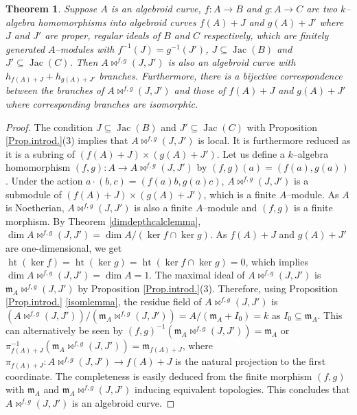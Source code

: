 \documentclass{amsart}%
\newtheorem{theorem}{Theorem}[section]
\theoremstyle{plain}
\numberwithin{equation}{section}
\theoremstyle{definition}
\DeclareMathOperator{\jac}{Jac}
\DeclareMathOperator{\height}{ht}
\begin{document}
    
\begin{theorem}\label{algebroidthm}
    Suppose $A$ is an algebroid curve, $f:A\to B$ and $g:A\to C$ are two $k$--algebra homomorphisms into algebroid curves $f(A)+J$ and $g(A)+J'$ where $J$ and $J'$ are proper, regular ideals of $B$ and $C$ respectively, which are finitely generated $A$--modules with $f^{-1}(J)=g^{-1}(J')$, $J\subseteq \jac(B)$ and $J'\subseteq \jac(C)$. Then $A\bowtie^{f,g}(J,J')$ is also an algebroid curve with $h_{f(A)+J}+h_{g(A)+J'}$ branches. Furthermore, there is a bijective correspondence between the branches of $A\bowtie^{f,g}(J,J')$ and those of $f(A)+J$ and $g(A)+J'$ where corresponding branches are isomorphic.
\end{theorem}
\begin{proof}
    The condition $J\subseteq \jac(B)$ and $J'\subseteq \jac(C)$ with Proposition \ref{Prop.introd.}(3) implies that $A\bowtie^{f,g}(J,J')$ is local. It is furthermore reduced as it is a subring of $(f(A)+J)\times (g(A)+J')$. Let us define a $k$--algebra homomorphism $(f,g):A\to A\bowtie^{f,g}(J,J')$ by $(f,g)(a)=(f(a),g(a))$. Under the action $a\cdot(b,c)=(f(a)b,g(a)c)$, $A\bowtie^{f,g}(J,J')$ is a submodule of $(f(A)+J)\times (g(A)+J')$, which is a finite $A$--module. As $A$ is Noetherian, $A\bowtie^{f,g}(J,J')$ is also a finite $A$--module and $(f,g)$ is a finite morphism. By Theorem \ref{dimdepthcalclemma}, $\dim A\bowtie^{f,g}(J,J')=\dim A/(\ker f\cap \ker g)$. As $f(A)+J$ and $g(A)+J'$ are one-dimensional, we get $\height (\ker f)=\height (\ker g)=\height (\ker f\cap \ker g)=0$, which implies $\dim A\bowtie^{f,g}(J,J')=\dim A=1$. The maximal ideal of $A\bowtie^{f,g}(J,J')$ is $\mathfrak{m}_A\bowtie^{f,g}(J,J')$ by Proposition \ref{Prop.introd.}(3). Therefore, using Proposition \ref{Prop.introd.} \ref{isomlemma}, the residue field of $A\bowtie^{f,g}(J,J')$ is $\left(A\bowtie^{f,g}(J,J')\right)/\left(\mathfrak{m}_A\bowtie^{f,g}(J,J')\right)=A/(\mathfrak{m}_A+I_0)=k$ as $I_0\subseteq\mathfrak{m}_A$. This can alternatively be seen by $(f,g)^{-1}\left(\mathfrak{m}_A\bowtie^{f,g}(J,J')\right)=\mathfrak{m}_A$ or $\pi_{f(A)+J}^{-1}\left(\mathfrak{m}_A\bowtie^{f,g}(J,J')\right)=\mathfrak{m}_{f(A)+J}$, where $\pi_{f(A)+J}:A\bowtie^{f,g}(J,J')\to f(A)+J$ is the natural projection to the first coordinate. The completeness is easily deduced from the finite morphism $(f,g)$ with $\mathfrak{m}_A$ and $\mathfrak{m}_A\bowtie^{f,g}(J,J')$ inducing equivalent topologies. This concludes that $A\bowtie^{f,g}(J,J')$ is an algebroid curve.\medskip


\end{proof}
\end{document}
